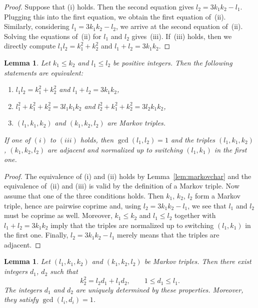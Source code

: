 \documentclass[10pt,a4paper]{amsart}
\newtheorem{lem}[thm]{Lemma}
\theoremstyle{definition}
\begin{document}
\begin{proof}
Suppose that (i) holds. Then the second equation gives
$l_2 = 3k_1k_2 - l_1$. Plugging this into the first
equation, we obtain the first equation of~(ii).
Similarly, considering $l_1 = 3k_1k_2 - l_2$, we arrive
at the second equation of~(ii).
Solving the equations of~(ii) for $l_1$ and $l_2$
gives~(iii).
If~(iii) holds, then we directly compute
$l_1l_2 = k_1^2 + k_2^2$ and $l_1+l_2 = 3k_1k_2$.
\end{proof}


\begin{lem}
\label{prop:markovchar}
Let $k_1 \le k_2$ and $l_1 \le l_2$ be positive integers.
Then the following statements are equivalent:
\begin{enumerate}\itemsep=0pt
\item[$(i)$]
$l_1l_2 = k_1^2 + k_2^2$ and $l_1+l_2 = 3k_1k_2$,
\item[$(ii)$]
$l_1^2 + k_1^2 + k_2^2 = 3l_1k_1k_2$ and $l_2^2 + k_1^2 + k_2^2 = 3l_2k_1k_2$,
\item[$(iii)$]
$(l_1,k_1,k_2)$ and $(k_1,k_2,l_2)$ are Markov triples.
\end{enumerate}
If one of $(i)$ to $(iii)$ holds, then $\gcd(l_1,l_2)=1$
and the triples $(l_1,k_1,k_2)$, $(k_1,k_2,l_2)$
are adjacent and normalized up to switching $(l_1,k_1)$
in the first one.
\end{lem}


\begin{proof}
The equivalence of (i) and (ii) holds by Lemma~\ref{lem:markovchar}
and the equivalence of~(ii) and (iii) is valid by the definition of
a Markov triple.
Now assume that one of the three conditions holds.
Then $k_1$, $k_2$, $l_2$ form a Markov triple, hence are pairwise
coprime and, using $l_2 = 3k_1k_2 - l_1$, we see that
$l_1$ and $l_2$ must be coprime as well.
Moreover, $k_1 \le k_2$ and $l_1 \le l_2$ together with
$l_1+l_2=3k_1k_2$ imply that the triples are normalized
up to switching $(l_1,k_1)$ in the first one.
Finally, $l_2= 3k_1k_2 - l_1$ merely means that the
triples are adjacent.
\end{proof}


\begin{lem}
\label{prop:markovd1d2}
Let $(l_1,k_1,k_2)$ and $(k_1,k_2,l_2)$ be
Markov triples.
Then there exist integers $d_1$, $d_2$ such that
\[
k_2^2 = l_2d_1 + l_1d_2,
\qquad
1 \le d_1 \le l_1.
\]
The integers $d_1$ and $d_2$ are uniquely determined by these
properties. Moreover, they satisfy $\gcd(l_i,d_i)=1$.
\end{lem}
\end{document}
